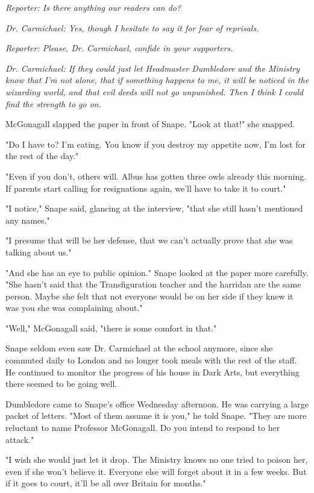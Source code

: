 \documentclass[a4paper,11pt]{article}
\begin{document}
\emph{Reporter: Is there anything our readers can do?}

\emph{Dr. Carmichael: Yes, though I hesitate to say it for fear of reprisals.}

\emph{Reporter: Please, Dr. Carmichael, confide in your supporters.}

\emph{Dr. Carmichael: If they could just let Headmaster Dumbledore and the Ministry know that I'm not alone, that if something happens to me, it will be noticed in the wizarding world, and that evil deeds will not go unpunished. Then I think I could find the strength to go on.}

McGonagall slapped the paper in front of Snape. "Look at that!" she snapped.

"Do I have to? I'm eating. You know if you destroy my appetite now, I'm lost for the rest of the day."

"Even if you don't, others will. Albus has gotten three owls already this morning. If parents start calling for resignations again, we'll have to take it to court."

"I notice," Snape said, glancing at the interview, "that she still hasn't mentioned any names."

"I presume that will be her defense, that we can't actually prove that she was talking about us."

"And she has an eye to public opinion." Snape looked at the paper more carefully. "She hasn't said that the Transfiguration teacher and the harridan are the same person. Maybe she felt that not everyone would be on her side if they knew it was you she was complaining about."

"Well," McGonagall said, "there is some comfort in that."

Snape seldom even saw Dr. Carmichael at the school anymore, since she commuted daily to London and no longer took meals with the rest of the staff. He continued to monitor the progress of his house in Dark Arts, but everything there seemed to be going well.

Dumbledore came to Snape's office Wednesday afternoon. He was carrying a large packet of letters. "Most of them assume it is you," he told Snape. "They are more reluctant to name Professor McGonagall. Do you intend to respond to her attack."

"I wish she would just let it drop. The Ministry knows no one tried to poison her, even if she won't believe it. Everyone else will forget about it in a few weeks. But if it goes to court, it'll be all over Britain for months."
\end{document}
